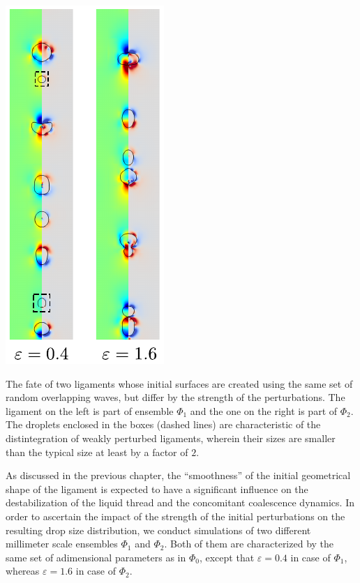\begin{marginfigure}[2cm]
\centering
\includegraphics{plots/drop_stats/amp_long_compare.pdf}
	\caption{The fate of two ligaments whose initial surfaces 
	are created using the same set of random overlapping waves, 
	but differ by the strength of the perturbations.
	The ligament on the left is part of ensemble $\Phi_1$ 
	and the one on the right is part of $\Phi_2$. 
	The droplets enclosed in the boxes (dashed lines)
	are characteristic of the distintegration of weakly perturbed ligaments,
	wherein their sizes are smaller than the typical size at least by a factor of $2$. 
	}
\label{amp_long_comp}
\end{marginfigure}

As discussed in the previous chapter, the ``smoothness'' of the initial geometrical
shape of the ligament is expected to have a significant influence on the 
destabilization of the liquid thread and the concomitant coalescence dynamics.
In order to ascertain the impact of the strength of the initial perturbations
on the resulting drop size distribution, we conduct simulations of two different 
millimeter scale ensembles $\Phi_1$ and $\Phi_2$. Both of them are characterized 
by the same set of adimensional parameters as in $\Phi_0$, except that $\varepsilon = 0.4$
in case of $\Phi_1$, whereas $\varepsilon = 1.6$ in case of $\Phi_2$.

